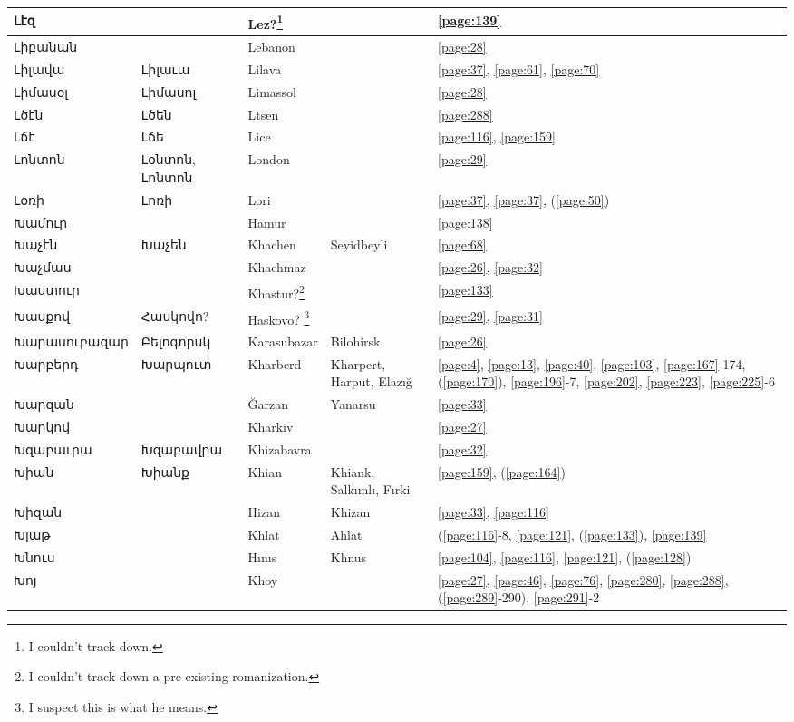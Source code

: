 \begin{center}
\begin{longtable}{|p{}|p{3cm}|p{3cm}|p{2cm}|p{3cm}|}
Լէզ& & Lez?\footnote{I couldn't track down.}& &\ref{page:139}\\ \hline
Լիբանան& &Lebanon & &\ref{page:28}\\ \hline
Լիլավա&Լիլաւա &Lilava & &\ref{page:37}, \ref{page:61}, \ref{page:70}\\ \hline
Լիմասօլ&Լիմասոլ &Limassol & &\ref{page:28}\\ \hline
Լծէն&Լծեն &Ltsen   & &\ref{page:288}\\ \hline
Լճէ&Լճե &Lice & &\ref{page:116}, \ref{page:159}\\ \hline
Լոնտոն&Լօնտոն, Լոնտոն &London & &\ref{page:29}\\ \hline
Լօռի&Լոռի & Lori& &\ref{page:37}, \ref{page:37}, (\ref{page:50})\\ \hline
Խամուր& &Hamur & &\ref{page:138}\\ \hline
Խաչէն&Խաչեն &Khachen & Seyidbeyli&\ref{page:68}\\ \hline
Խաչմաս& & Khachmaz& &\ref{page:26}, \ref{page:32}\\ \hline
Խաստուր& &Khastur?\footnote{I couldn't track down a pre-existing romanization.} & &\ref{page:133}\\ \hline
Խասքով&Հասկովո? &Haskovo? \footnote{I suspect this is what he means.} &  &\ref{page:29}, \ref{page:31}\\ \hline
Խարասուբազար&Բելոգորսկ & Karasubazar&Bilohirsk &\ref{page:26}\\ \hline
Խարբերդ& Խարպուտ
&Kharberd &Kharpert, Harput, Elazığ &\ref{page:4}, \ref{page:13}, \ref{page:40}, \ref{page:103}, \ref{page:167}-174, (\ref{page:170}), \ref{page:196}-7, \ref{page:202}, \ref{page:223}, \ref{page:225}-6\\ \hline
Խարզան& & Ğarzan&Yanarsu &\ref{page:33}\\ \hline
Խարկով& &Kharkiv & &\ref{page:27}\\ \hline
Խզաբաւրա&Խզաբավրա & Khizabavra& &\ref{page:32}\\ \hline
Խիան& Խիանք&Khian &Khiank, Salkımlı, Fırki &\ref{page:159}, (\ref{page:164})\\ \hline
Խիզան& &Hizan &Khizan &\ref{page:33}, \ref{page:116}\\ \hline
Խլաթ& & Khlat& Ahlat&(\ref{page:116}-8, \ref{page:121}, (\ref{page:133}), \ref{page:139}\\ \hline
Խնուս& & Hınıs   &Khnus &\ref{page:104}, \ref{page:116}, \ref{page:121}, (\ref{page:128})\\ \hline
Խոյ& &Khoy & &\ref{page:27}, \ref{page:46}, \ref{page:76}, \ref{page:280}, \ref{page:288}, (\ref{page:289}-290), \ref{page:291}-2\\ \hline

\end{longtable}
\end{center}
